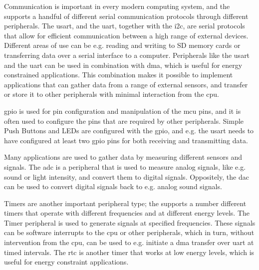 Communication is important in every modern computing system, and the {\gecko} supports a handful of different serial communication protocols through different peripherals.
The \gls{usart}, and the \gls{uart}, together with the \gls{i2c}, are serial protocols that allow for efficient communication between a high range of external devices.
Different areas of use can be e.g. reading and writing to SD memory cards or transferring data over a serial interface to a computer.
Peripherals like the \gls{usart} and the \gls{uart} can be used in combination with \gls{dma}, which is useful for energy constrained applications.
This combination makes it possible to implement applications that can gather data from a range of external sensors, and transfer or store it to other peripherals with minimal interaction from the \gls{cpu}.

\gls{gpio} is used for pin configuration and manipulation of the \gls{mcu} pins, and it is often used to configure the pins that are required by other peripherals.
Simple Push Buttons and LEDs are configured with the \gls{gpio}, and e.g. the \gls{usart} needs to have configured at least two \gls{gpio} pins for both receiving and transmitting data.

Many applications are used to gather data by measuring different sensors and signals.
The \gls{adc} is a peripheral that is used to measure analog signals, like e.g. sound or light intensity, and convert them to digital signals.
Oppositely, the \gls{dac} can be used to convert digital signals back to e.g. analog sound signals.

Timers are another important peripheral type; the {\gecko} supports a number different timers that operate with different frequencies and at different energy levels.
The Timer peripheral is used to generate signals at specified frequencies.
These signals can be software interrupts to the \gls{cpu} or other peripherals, which in turn, without intervention from the \gls{cpu}, can be used to e.g. initiate a \gls{dma} transfer over \gls{uart} at timed intervals.
The \gls{rtc} is another timer that works at low energy levels, which is useful for energy constraint applications.
